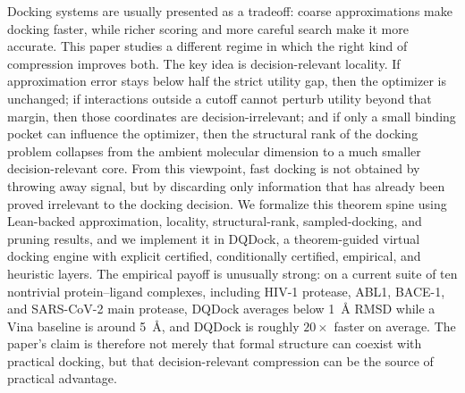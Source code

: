 Docking systems are usually presented as a tradeoff: coarse approximations make docking faster, while richer scoring and more careful search make it more accurate. This paper studies a different regime in which the right kind of compression improves both. The key idea is decision-relevant locality. If approximation error stays below half the strict utility gap, then the optimizer is unchanged; if interactions outside a cutoff cannot perturb utility beyond that margin, then those coordinates are decision-irrelevant; and if only a small binding pocket can influence the optimizer, then the structural rank of the docking problem collapses from the ambient molecular dimension to a much smaller decision-relevant core. From this viewpoint, fast docking is not obtained by throwing away signal, but by discarding only information that has already been proved irrelevant to the docking decision. We formalize this theorem spine using Lean-backed approximation, locality, structural-rank, sampled-docking, and pruning results, and we implement it in DQDock, a theorem-guided virtual docking engine with explicit certified, conditionally certified, empirical, and heuristic layers. The empirical payoff is unusually strong: on a current suite of ten nontrivial protein--ligand complexes, including HIV-1 protease, ABL1, BACE-1, and SARS-CoV-2 main protease, DQDock averages below 1~\AA{} RMSD while a Vina baseline is around 5~\AA{}, and DQDock is roughly $20\times$ faster on average. The paper's claim is therefore not merely that formal structure can coexist with practical docking, but that decision-relevant compression can be the source of practical advantage.

